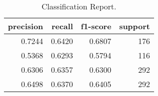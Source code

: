\begin{table}
\centering
\caption{Classification Report.}
\label{tab:classification-report}
\begin{tabular}{rrrr}
\toprule
 precision &  recall &  f1-score &  support \\
\midrule
    0.7244 &  0.6420 &    0.6807 &      176 \\
    0.5368 &  0.6293 &    0.5794 &      116 \\
    0.6306 &  0.6357 &    0.6300 &      292 \\
    0.6498 &  0.6370 &    0.6405 &      292 \\
\bottomrule
\end{tabular}
\end{table}
